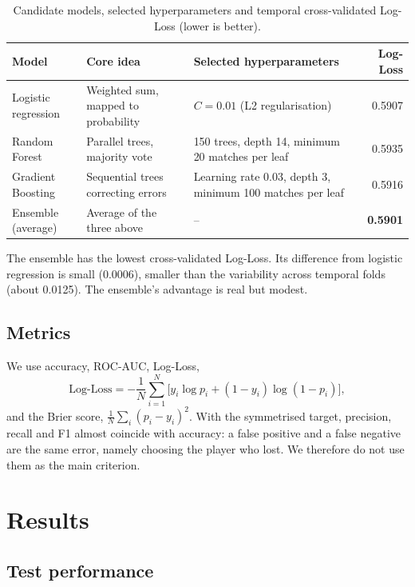 \documentclass[11pt,a4paper]{article}
\begin{document}
\begin{table}[H]
\centering
\caption{Candidate models, selected hyperparameters and temporal cross-validated Log-Loss (lower is better).}
\label{tab:models}
\begin{tabular}{llp{4.6cm}r}
\toprule
Model & Core idea & Selected hyperparameters & Log-Loss \\
\midrule
Logistic regression & Weighted sum, mapped to probability & $C=0.01$ (L2 regularisation) & 0.5907 \\
Random Forest & Parallel trees, majority vote & 150 trees, depth 14, minimum 20 matches per leaf & 0.5935 \\
Gradient Boosting & Sequential trees correcting errors & Learning rate 0.03, depth 3, minimum 100 matches per leaf & 0.5916 \\
Ensemble (average) & Average of the three above & -- & \textbf{0.5901} \\
\bottomrule
\end{tabular}
\end{table}

The ensemble has the lowest cross-validated Log-Loss. Its difference from logistic regression is small (0.0006), smaller than the variability across temporal folds (about 0.0125). The ensemble's advantage is real but modest.

\subsection{Metrics}

We use accuracy, ROC-AUC, Log-Loss,
\begin{equation}
  \text{Log-Loss} = -\frac{1}{N}\sum_{i=1}^{N}\big[y_i\log p_i + (1-y_i)\log(1-p_i)\big],
\end{equation}
and the Brier score, $\frac{1}{N}\sum_i (p_i - y_i)^2$. With the symmetrised target, precision, recall and F1 almost coincide with accuracy: a false positive and a false negative are the same error, namely choosing the player who lost. We therefore do not use them as the main criterion.

\section{Results}

\subsection{Test performance}
\end{document}
